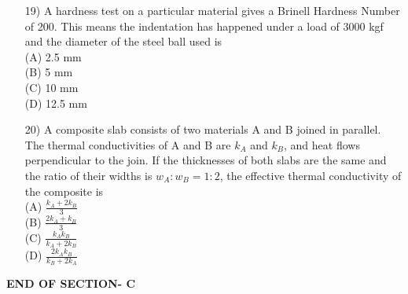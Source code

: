 \documentclass[journal,12pt,onecolumn]{IEEEtran}
\begin{document}
\begin{enumerate}
\item[19)] A hardness test on a particular material gives a Brinell Hardness Number of 200. This means the indentation has happened under a load of 3000 kgf and the diameter of the steel ball used is
\vspace{0.2cm}
\hfill{}\\
(A) 2.5 mm \\
(B) 5 mm \\
(C) 10 mm \\
(D) 12.5 mm
\vspace{0.5cm}

\item[20)] A composite slab consists of two materials A and B joined in parallel. The thermal conductivities of A and B are $k_A$ and $k_B$, and heat flows perpendicular to the join. If the thicknesses of both slabs are the same and the ratio of their widths is $w_A : w_B = 1:2$, the effective thermal conductivity of the composite is
\vspace{0.2cm}
\hfill{}\\
(A) $\frac{k_A + 2k_B}{3}$ \\
(B) $\frac{2k_A + k_B}{3}$ \\
(C) $\frac{k_A k_B}{k_A + 2k_B}$ \\
(D) $\frac{2k_A k_B}{k_B + 2k_A}$
\vspace{0.5cm}

\end{enumerate}


\vspace{3\baselineskip}
    \begin{center}
    \textbf{\Large END OF SECTION- C}
    \end{center}

\newpage
\end{document}
